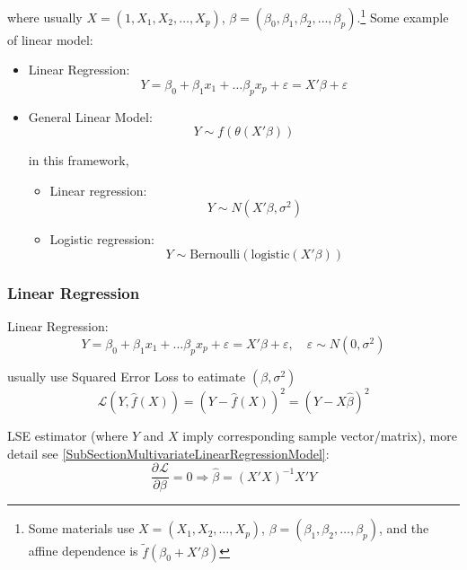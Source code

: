     where usually $ X=(1,X_{1},X_{2},\ldots,X_{p}) $, $ \beta =(\beta _0,\beta _{1},\beta _{2},\ldots,\beta _{p})  $.\footnote{Some materials use  $ X=(X_{1},X_{2},\ldots,X_{p}) $, $ \beta =(\beta _{1},\beta _{2},\ldots,\beta _{p})  $, and the affine dependence is $ \tilde{f}(\beta _0+X'\beta ) $} Some example of linear model:
    \begin{itemize}[topsep=2pt,itemsep=0pt]
        \item Linear Regression:
        \[
            Y=\beta _0 +\beta _1x_1+\ldots \beta _px_p+\varepsilon =X'\beta +\varepsilon 
        \]
        \item General Linear Model:
        \[
            Y\sim f(\theta (X'\beta ))  
        \]

        in this framework, 
        \begin{itemize}[topsep=2pt,itemsep=0pt]
            \item Linear regression:
            \[
                Y\sim N(X'\beta ,\sigma ^2) 
            \]
            \item Logistic regression:
            \[
                Y\sim \mathrm{Bernoulli}(\mathrm{logistic}(X'\beta ) )  
            \]
        \end{itemize}
    \end{itemize}
    
  
\subsubsection{Linear Regression}
    Linear Regression:
    \[
        Y=\beta _0 +\beta _1x_1+\ldots \beta _px_p+\varepsilon =X'\beta +\varepsilon ,\quad \varepsilon \sim N(0,\sigma ^2)
    \]
    
    usually use Squared Error Loss to eatimate $ (\beta ,\sigma ^2) $
    \[
        \mathcal{L}(Y,\hat{f}(X))=\left(Y-\hat{f}(X)\right)^2=\left(Y-X\hat{\beta } \right)^2 
    \]

    LSE estimator (where $ Y $ and $ X $ imply corresponding sample vector/matrix), more detail see \autoref{SubSectionMultivariateLinearRegressionModel}:
    \[
        \dfrac{\partial^{} \mathcal{L}}{\partial \beta ^{}}=0\Rightarrow \hat{\beta }=(X'X)^{-1}X'Y 
    \]
    

